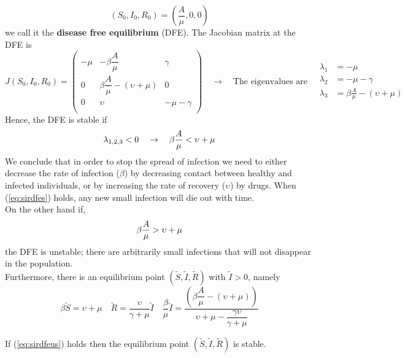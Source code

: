 \begin{equation}
	(S_0,I_0,R_0)=\left(\frac{A}{\mu},0,0\right)
\end{equation}
we call it the \textbf{disease free equilibrium} (DFE). The Jacobian matrix at the DFE is
\begin{equation}
	J(S_0,I_0,R_0)=
	\begin{pmatrix}
		-\mu&-\beta\dfrac{A}{\mu}&\gamma\\
		0&\beta\dfrac{A}{\mu}-(\upsilon+\mu)&0\\
		0&\upsilon&-\mu-\gamma\\
	\end{pmatrix}\quad\rightarrow\quad\text{The eigenvalues are}\quad
	\begin{aligned}
		\lambda_1&=-\mu\\
		\lambda_2&=-\mu-\gamma\\
		\lambda_3&=\beta\frac{A}{\mu}-(\upsilon+\mu)
	\end{aligned}
\end{equation}
Hence, the DFE is stable if
\begin{equation}{\label{eq:sirdfes}}
	\lambda_{1,2,3}<0\quad\rightarrow\quad\beta\frac{A}{\mu}<\upsilon+\mu
\end{equation}
We conclude that in order to stop the spread of infection we need to either decrease the rate of infection ($\beta$) by decreasing contact between healthy and infected individuals, or by increasing the rate of recovery ($\upsilon$) by drugs.
When (\ref{eq:sirdfes}) holds, any new small infection will die out with time.\\
On the other hand if,
\begin{equation}{\label{eq:sirdfeus}}
	\beta\frac{A}{\mu}>\upsilon+\mu
\end{equation}
the DFE is unstable; there are arbitrarily small infections that will not disappear in the population.\\
Furthermore, there is an equilibrium point $(\tilde{S},\tilde{I},\tilde{R})$ with $\tilde{I}>0$, namely
\begin{equation}
	\beta\tilde{S}=\upsilon+\mu\quad\tilde{R}=\frac{\upsilon}{\gamma+\mu}\tilde{I}\quad\frac{\beta}{\mu}\tilde{I}=\frac{\left(\beta\dfrac{A}{\mu}-(\upsilon+\mu)\right)}{\upsilon+\mu-\dfrac{\gamma\upsilon}{\gamma+\mu}}
\end{equation}
\begin{theorem}
	If (\ref{eq:sirdfeus}) holds then the equilibrium point $(\tilde{S},\tilde{I},\tilde{R})$ is stable.
\end{theorem}
